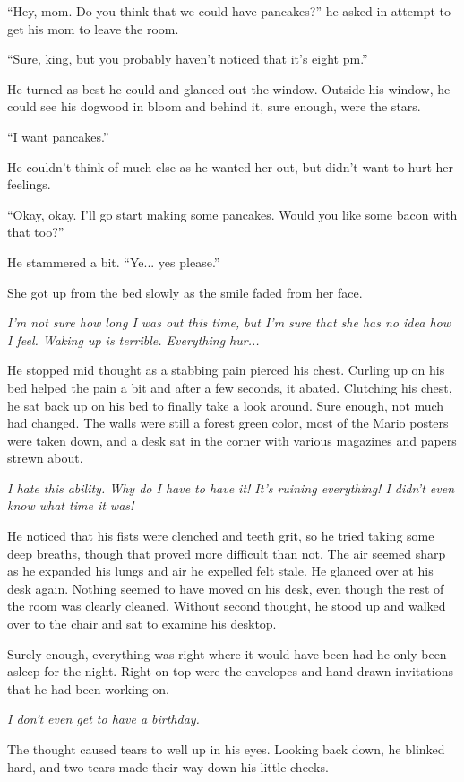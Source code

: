 ``Hey, mom. Do you think that we could have pancakes?'' he asked in attempt to get his mom to leave the room.

``Sure, king, but you probably haven't noticed that it's eight pm.''

He turned as best he could and glanced out the window. Outside his window, he could see his dogwood in bloom and behind it, sure enough, were the stars.

``I want pancakes.''

He couldn't think of much else as he wanted her out, but didn't want to hurt her feelings.

``Okay, okay. I'll go start making some pancakes. Would you like some bacon with that too?''

He stammered a bit. ``Ye... yes please.''

She got up from the bed slowly as the smile faded from her face.

\textit{I'm not sure how long I was out this time, but I'm sure that she has no idea how I feel. Waking up is terrible. Everything hur...}

He stopped mid thought as a stabbing pain pierced his chest. Curling up on his bed helped the pain a bit and after a few seconds, it abated. Clutching his chest, he sat back up on his bed to finally take a look around. Sure enough, not much had changed. The walls were still a forest green color, most of the Mario posters were taken down, and a desk sat in the corner with various magazines and papers strewn about.

\textit{I hate this ability. Why do I have to have it! It's ruining everything! I didn't even know what time it was!}

He noticed that his fists were clenched and teeth grit, so he tried taking some deep breaths, though that proved more difficult than not. The air seemed sharp as he expanded his lungs and air he expelled felt stale. He glanced over at his desk again. Nothing seemed to have moved on his desk, even though the rest of the room was clearly cleaned. Without second thought, he stood up and walked over to the chair and sat to examine his desktop.

Surely enough, everything was right where it would have been had he only been asleep for the night. Right on top were the envelopes and hand drawn invitations that he had been working on.

\textit{I don't even get to have a birthday.}

The thought caused tears to well up in his eyes. Looking back down, he blinked hard, and two tears made their way down his little cheeks.

